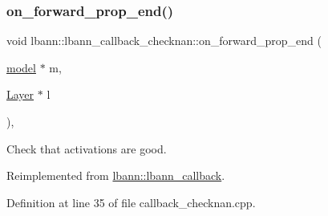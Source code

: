 \subsubsection{\texorpdfstring{on\+\_\+forward\+\_\+prop\+\_\+end()}{on\_forward\_prop\_end()}}
{\footnotesize\ttfamily void lbann\+::lbann\+\_\+callback\+\_\+checknan\+::on\+\_\+forward\+\_\+prop\+\_\+end (\begin{DoxyParamCaption}\item[{\hyperlink{classlbann_1_1model}{model} $\ast$}]{m,  }\item[{\hyperlink{classlbann_1_1Layer}{Layer} $\ast$}]{l }\end{DoxyParamCaption})\hspace{0.3cm}{\ttfamily [override]}, {\ttfamily [virtual]}}

Check that activations are good. 

Reimplemented from \hyperlink{classlbann_1_1lbann__callback_a5eff0a59fbce98a981d9cdd0547a3ad5}{lbann\+::lbann\+\_\+callback}.



Definition at line 35 of file callback\+\_\+checknan.\+cpp.


